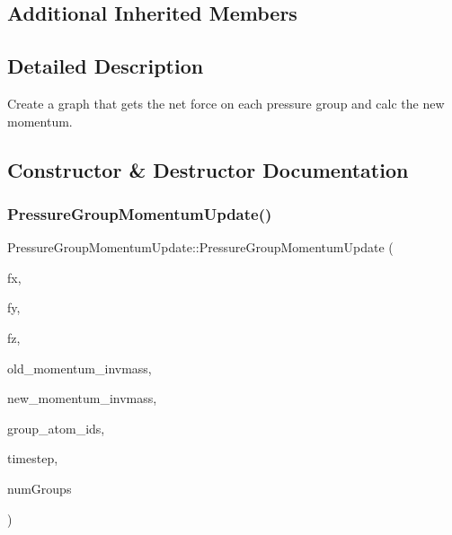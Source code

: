 \subsection*{Additional Inherited Members}


\subsection{Detailed Description}
Create a graph that gets the net force on each pressure group and calc the new momentum. 



\subsection{Constructor \& Destructor Documentation}
\hypertarget{classPressureGroupMomentumUpdate_a2bfd6839085a1c51d0e2354dd1626763}{}\label{classPressureGroupMomentumUpdate_a2bfd6839085a1c51d0e2354dd1626763} 
\subsubsection{\texorpdfstring{Pressure\+Group\+Momentum\+Update()}{PressureGroupMomentumUpdate()}}
{\footnotesize\ttfamily Pressure\+Group\+Momentum\+Update\+::\+Pressure\+Group\+Momentum\+Update (\begin{DoxyParamCaption}\item[{const double $\ast$\+\_\+\+\_\+restrict\+\_\+\+\_\+}]{fx,  }\item[{const double $\ast$\+\_\+\+\_\+restrict\+\_\+\+\_\+}]{fy,  }\item[{const double $\ast$\+\_\+\+\_\+restrict\+\_\+\+\_\+}]{fz,  }\item[{const double4 $\ast$}]{old\+\_\+momentum\+\_\+invmass,  }\item[{double4 $\ast$}]{new\+\_\+momentum\+\_\+invmass,  }\item[{const \hyperlink{structAtomIdList__t}{Atom\+Id\+List\+\_\+t} $\ast$\+\_\+\+\_\+restrict\+\_\+\+\_\+}]{group\+\_\+atom\+\_\+ids,  }\item[{double}]{timestep,  }\item[{int}]{num\+Groups }\end{DoxyParamCaption})}



